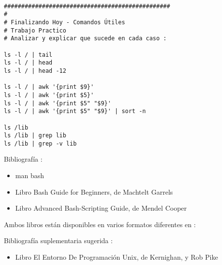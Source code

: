 \documentclass{beamer}
\begin{document}
\begin{Verbatim}

################################################
#
# Finalizando Hoy - Comandos Útiles
# Trabajo Practico 
# Analizar y explicar que sucede en cada caso :

ls -l / | tail 
ls -l / | head 
ls -l / | head -12

ls -l / | awk '{print $9}'
ls -l / | awk '{print $5}'
ls -l / | awk '{print $5" "$9}'
ls -l / | awk '{print $5" "$9}' | sort -n

ls /lib
ls /lib | grep lib
ls /lib | grep -v lib
\end{Verbatim}




\begin{frame}
Bibliografía : 
\begin{itemize}
\item man bash
\item Libro Bash Guide for Beginners, de Machtelt Garrels 
\item Libro Advanced Bash-Scripting Guide, de Mendel Cooper
\end{itemize}

Ambos libros están disponibles en varios formatos diferentes en :

Bibliografía suplementaria sugerida : 
\begin{itemize}
\item Libro El Entorno De Programación Unix, de Kernighan, y Rob Pike
\end{itemize}

\end{frame}
\end{document}
